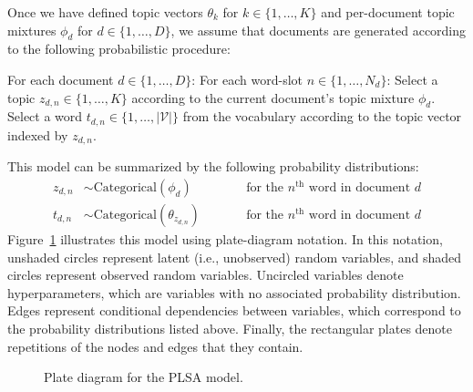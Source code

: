 \documentclass{article}
\newcommand{\nth}{^{\text{th}}}
\begin{document}
Once we have defined topic vectors $\theta_k$ for $k \in \{1, \ldots, K\}$ and per-document topic mixtures $\phi_d$ for $d \in \{1, \ldots, D\}$, we assume that documents are generated according to the following probabilistic procedure:
\begin{outline}
\1 For each document $d \in \{1, \ldots, D\}$:
  \2 For each word-slot $n \in \{1, \ldots, N_d\}$:
    \3 Select a topic $z_{d,n} \in \{1, \ldots, K\}$ according to the current document's topic mixture $\phi_d$.
    \3 Select a word $t_{d,n} \in \{1, \ldots, |\mathcal V|\}$ from the vocabulary according to the topic vector indexed by $z_{d,n}$.
\end{outline}

This model can be summarized by the following probability distributions:
\begin{align}
z_{d,n} &\sim \text{Categorical}(\phi_d) &\qquad&\text{for the $n\nth$ word in document $d$} \\
t_{d,n} &\sim \text{Categorical}(\theta_{z_{d,n}}) &\qquad&\text{for the $n\nth$ word in document $d$}
\end{align}
Figure~\ref{fig:plate-plsa} illustrates this model using plate-diagram notation.
In this notation, unshaded circles represent latent (i.e., unobserved) random variables, and shaded circles represent observed random variables.
Uncircled variables denote hyperparameters, which are variables with no associated probability distribution.
Edges represent conditional dependencies between variables, which correspond to the probability distributions listed above.
Finally, the rectangular plates denote repetitions of the nodes and edges that they contain.

\begin{figure}[htb]
%
\centering
{}
%
\caption{Plate diagram for the PLSA model.}
\label{fig:plate-plsa}
\end{figure}
\end{document}
